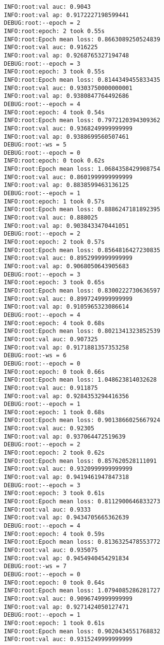 \documentclass[11pt]{article}
\begin{document}
\begin{verbatim}
INFO:root:val auc: 0.9043
INFO:root:val ap: 0.9172227198599441
DEBUG:root:--epoch = 2
INFO:root:epoch: 2 took 0.55s
INFO:root:Epoch mean loss: 0.8663089250524839
INFO:root:val auc: 0.916225
INFO:root:val ap: 0.9268765327194748
DEBUG:root:--epoch = 3
INFO:root:epoch: 3 took 0.55s
INFO:root:Epoch mean loss: 0.8144349455833435
INFO:root:val auc: 0.9303750000000001
INFO:root:val ap: 0.9380847764492686
DEBUG:root:--epoch = 4
INFO:root:epoch: 4 took 0.54s
INFO:root:Epoch mean loss: 0.7972120394309362
INFO:root:val auc: 0.9368249999999999
INFO:root:val ap: 0.9388699560507461
DEBUG:root:-ws = 5
DEBUG:root:--epoch = 0
INFO:root:epoch: 0 took 0.62s
INFO:root:Epoch mean loss: 1.0684358429908754
INFO:root:val auc: 0.8601999999999999
INFO:root:val ap: 0.8838599463136125
DEBUG:root:--epoch = 1
INFO:root:epoch: 1 took 0.57s
INFO:root:Epoch mean loss: 0.8886247181892395
INFO:root:val auc: 0.888025
INFO:root:val ap: 0.9038433470441051
DEBUG:root:--epoch = 2
INFO:root:epoch: 2 took 0.57s
INFO:root:Epoch mean loss: 0.8564816427230835
INFO:root:val auc: 0.8952999999999999
INFO:root:val ap: 0.9068050643905683
DEBUG:root:--epoch = 3
INFO:root:epoch: 3 took 0.65s
INFO:root:Epoch mean loss: 0.8300222730636597
INFO:root:val auc: 0.8997249999999999
INFO:root:val ap: 0.9105965323086614
DEBUG:root:--epoch = 4
INFO:root:epoch: 4 took 0.68s
INFO:root:Epoch mean loss: 0.8021341323852539
INFO:root:val auc: 0.907325
INFO:root:val ap: 0.9171881357353258
DEBUG:root:-ws = 6
DEBUG:root:--epoch = 0
INFO:root:epoch: 0 took 0.66s
INFO:root:Epoch mean loss: 1.048623814032628
INFO:root:val auc: 0.911875
INFO:root:val ap: 0.9284353294416356
DEBUG:root:--epoch = 1
INFO:root:epoch: 1 took 0.68s
INFO:root:Epoch mean loss: 0.9013866025667924
INFO:root:val auc: 0.92305
INFO:root:val ap: 0.937064472519639
DEBUG:root:--epoch = 2
INFO:root:epoch: 2 took 0.62s
INFO:root:Epoch mean loss: 0.857620528111091
INFO:root:val auc: 0.9320999999999999
INFO:root:val ap: 0.9419461947847318
DEBUG:root:--epoch = 3
INFO:root:epoch: 3 took 0.61s
INFO:root:Epoch mean loss: 0.8112900646833273
INFO:root:val auc: 0.9333
INFO:root:val ap: 0.9434705665362639
DEBUG:root:--epoch = 4
INFO:root:epoch: 4 took 0.59s
INFO:root:Epoch mean loss: 0.8136325478553772
INFO:root:val auc: 0.935075
INFO:root:val ap: 0.9454940454291834
DEBUG:root:-ws = 7
DEBUG:root:--epoch = 0
INFO:root:epoch: 0 took 0.64s
INFO:root:Epoch mean loss: 1.0794085286281727
INFO:root:val auc: 0.9096749999999999
INFO:root:val ap: 0.9271424050127471
DEBUG:root:--epoch = 1
INFO:root:epoch: 1 took 0.61s
INFO:root:Epoch mean loss: 0.9020434551768832
INFO:root:val auc: 0.9315249999999999

\end{verbatim}
\end{document}
